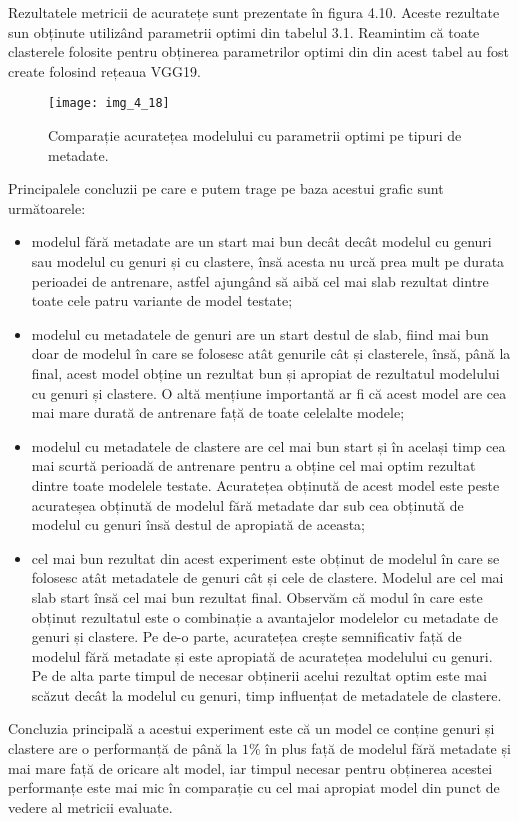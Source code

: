 Rezultatele metricii de acuratețe sunt prezentate în figura 4.10. Aceste rezultate sun obținute utilizând parametrii optimi din tabelul 3.1. Reamintim că toate clasterele folosite pentru obținerea parametrilor optimi din din acest tabel au fost create folosind rețeaua VGG19.
\begin{figure}[!h]
	\centering
	\texttt{[image: img\_4\_18]}
	\caption[Comparație acuratețea modelului cu parametrii optimi pe tipuri de metadate]{Comparație acuratețea modelului cu parametrii optimi pe tipuri de metadate.}
\end{figure}
Principalele concluzii pe care e putem trage pe baza acestui grafic sunt următoarele:
\begin{itemize}
	\item modelul fără metadate are un start mai bun decât decât modelul cu genuri sau modelul cu genuri și cu clastere, însă acesta nu urcă prea mult pe durata perioadei de antrenare, astfel ajungând să aibă cel mai slab rezultat dintre toate cele patru variante de model testate;
	\item modelul cu metadatele de genuri are un start destul de slab, fiind mai bun doar de modelul în care se folosesc atât genurile cât și clasterele, însă, până la final, acest model obține un rezultat bun și apropiat de rezultatul modelului cu genuri și clastere. O altă mențiune importantă ar fi că acest model are cea mai mare durată de antrenare față de toate celelalte modele;
	\item modelul cu metadatele de clastere are cel mai bun start și în același timp cea mai scurtă perioadă de antrenare pentru a obține cel mai optim rezultat dintre toate modelele testate. Acuratețea obținută de acest model este peste acurateșea obținută de modelul fără metadate dar sub cea obținută de modelul cu genuri însă destul de apropiată de aceasta;
	\item cel mai bun rezultat din acest experiment este obținut de modelul în care se folosesc atât metadatele de genuri cât și cele de clastere. Modelul are cel mai slab start însă cel mai bun rezultat final. Observăm că modul în care este obținut rezultatul este o combinație a avantajelor modelelor cu metadate de genuri și clastere. Pe de-o parte, acuratețea crește semnificativ față de modelul fără metadate și este apropiată de acuratețea modelului cu genuri. Pe de alta parte timpul de necesar obținerii acelui rezultat optim este mai scăzut decât la modelul cu genuri, timp influențat de metadatele de clastere.
\end{itemize}
Concluzia principală a acestui experiment este că un model ce conține genuri și clastere are o performanță de până la $1\%$ în plus față de modelul fără metadate și mai mare față de oricare alt model, iar timpul necesar pentru obținerea acestei performanțe este mai mic în comparație cu cel mai apropiat model din punct de vedere al metricii evaluate.

